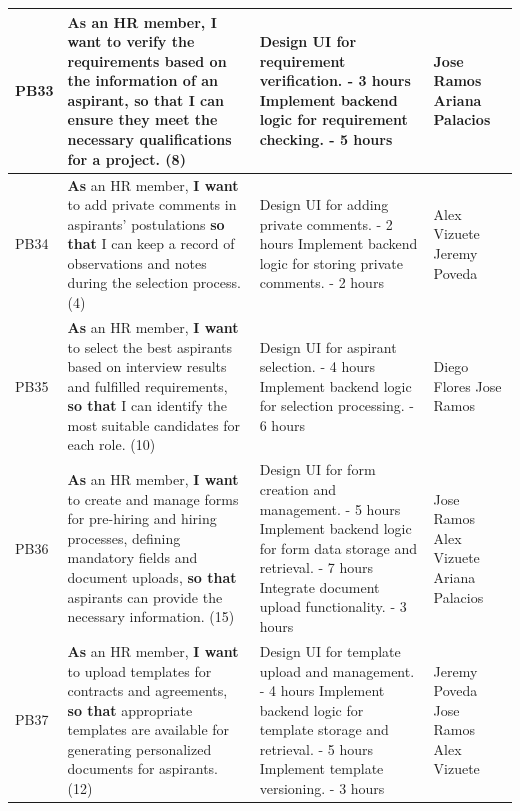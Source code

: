 \documentclass{scrreprt}
\begin{document}
\begin{longtable}{|p{1.5cm}|p{5.5cm}|p{4.5cm}|p{3cm}|}
	PB33 & \textbf{As} an HR member, \textbf{I want} to verify the requirements based on the information of an aspirant, \textbf{so that} I can ensure they meet the necessary qualifications for a project. (8) &
	Design UI for requirement verification. - 3 hours \newline
	Implement backend logic for requirement checking. - 5 hours &
	Jose Ramos \newline
	Ariana Palacios \\ \hline
	
	PB34 & \textbf{As} an HR member, \textbf{I want} to add private comments in aspirants' postulations \textbf{so that} I can keep a record of observations and notes during the selection process. (4) &
	Design UI for adding private comments. - 2 hours \newline
	Implement backend logic for storing private comments. - 2 hours &
	Alex Vizuete \newline
	Jeremy Poveda \\ \hline
	
	PB35 & \textbf{As} an HR member, \textbf{I want} to select the best aspirants based on interview results and fulfilled requirements, \textbf{so that} I can identify the most suitable candidates for each role. (10) &
	Design UI for aspirant selection. - 4 hours \newline
	Implement backend logic for selection processing. - 6 hours &
	Diego Flores \newline
	Jose Ramos \\ \hline
	
	PB36 & \textbf{As} an HR member, \textbf{I want} to create and manage forms for pre-hiring and hiring processes, defining mandatory fields and document uploads, \textbf{so that} aspirants can provide the necessary information. (15) &
	Design UI for form creation and management. - 5 hours \newline
	Implement backend logic for form data storage and retrieval. - 7 hours \newline
	Integrate document upload functionality. - 3 hours &
	Jose Ramos \newline
	Alex Vizuete \newline
	Ariana Palacios \\ \hline
	
	PB37 & \textbf{As} an HR member, \textbf{I want} to upload templates for contracts and agreements, \textbf{so that} appropriate templates are available for generating personalized documents for aspirants. (12) &
	Design UI for template upload and management. - 4 hours \newline
	Implement backend logic for template storage and retrieval. - 5 hours \newline
	Implement template versioning. - 3 hours &
	Jeremy Poveda \newline
	Jose Ramos \newline
	Alex Vizuete \\ \hline
	

\end{longtable}
\end{document}
